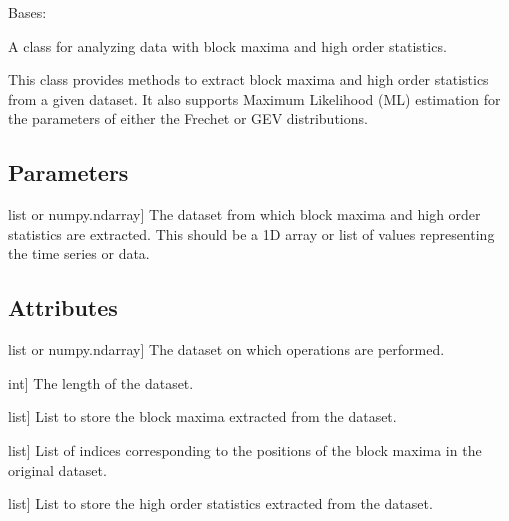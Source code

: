 \documentclass[a4paper,11pt,openany,english]{sphinxmanual}
\begin{document}
\begin{fulllineitems}
\label{\detokenize{api_topt:xtremes.topt.Data}}
\pysigstartsignatures
{}
\pysigstopsignatures
\sphinxAtStartPar
Bases: 

\sphinxAtStartPar
A class for analyzing data with block maxima and high order statistics.

\sphinxAtStartPar
This class provides methods to extract block maxima and high order statistics from a given dataset. 
It also supports Maximum Likelihood (ML) estimation for the parameters of either the Frechet or GEV distributions.


\subsection{Parameters}
\label{\detokenize{api_topt:id13}}\begin{description}
\sphinxlineitem{values}{[}list or numpy.ndarray{]}
\sphinxAtStartPar
The dataset from which block maxima and high order statistics are extracted. This should be a 1D array 
or list of values representing the time series or data.

\end{description}


\subsection{Attributes}
\label{\detokenize{api_topt:id14}}\begin{description}
\sphinxlineitem{values}{[}list or numpy.ndarray{]}
\sphinxAtStartPar
The dataset on which operations are performed.

\sphinxlineitem{len}{[}int{]}
\sphinxAtStartPar
The length of the dataset.

\sphinxlineitem{blockmaxima}{[}list{]}
\sphinxAtStartPar
List to store the block maxima extracted from the dataset.

\sphinxlineitem{bm\_indices}{[}list{]}
\sphinxAtStartPar
List of indices corresponding to the positions of the block maxima in the original dataset.

\sphinxlineitem{high\_order\_stats}{[}list{]}
\sphinxAtStartPar
List to store the high order statistics extracted from the dataset.


\end{description}
\end{fulllineitems}
\end{document}
